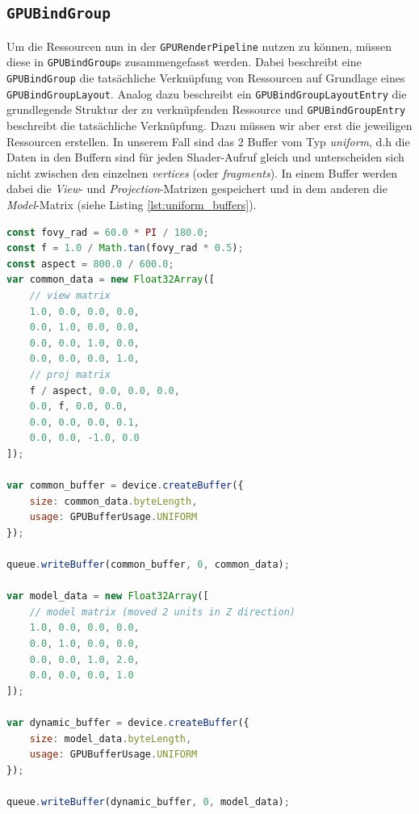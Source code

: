 \documentclass[oneside]{ausarbeitung}
\begin{document}
\subsection{\texttt{GPUBindGroup}}
Um die Ressourcen nun in der \texttt{GPURenderPipeline} nutzen zu können, müssen diese in \texttt{GPUBindGroup}s zusammengefasst werden. Dabei beschreibt eine \texttt{GPUBindGroup} die tatsächliche Verknüpfung von Ressourcen auf Grundlage eines \texttt{GPUBindGroupLayout}. Analog dazu beschreibt ein \texttt{GPUBindGroupLayoutEntry} die grundlegende Struktur der zu verknüpfenden Ressource und \texttt{GPUBindGroupEntry} beschreibt die tatsächliche Verknüpfung. Dazu müssen wir aber erst die jeweiligen Ressourcen erstellen. In unserem Fall sind das 2 Buffer vom Typ \textit{uniform}, d.h die Daten in den Buffern sind für jeden Shader-Aufruf gleich und unterscheiden sich nicht zwischen den einzelnen \textit{vertices} (oder \textit{fragments}). In einem Buffer werden dabei die \textit{View}- und \textit{Projection}-Matrizen gespeichert und in dem anderen die \textit{Model}-Matrix (siehe Listing \ref{lst:uniform_buffers}). 

\begin{minipage}{\textwidth}
\begin{lstlisting}[language=JavaScript, label={lst:uniform_buffers}, caption={Erstellen der Uniform-Buffer für einerseits \textit{common data} (\textit{View}- / \textit{Projection}-Matrix) und anderseits \textit{dynamic data} (\textit{Model}-Matrix).}]
const fovy_rad = 60.0 * PI / 180.0;
const f = 1.0 / Math.tan(fovy_rad * 0.5);
const aspect = 800.0 / 600.0;
var common_data = new Float32Array([
    // view matrix
    1.0, 0.0, 0.0, 0.0,
    0.0, 1.0, 0.0, 0.0,
    0.0, 0.0, 1.0, 0.0,
    0.0, 0.0, 0.0, 1.0,
    // proj matrix
    f / aspect, 0.0, 0.0, 0.0,
    0.0, f, 0.0, 0.0,
    0.0, 0.0, 0.0, 0.1,
    0.0, 0.0, -1.0, 0.0
]);

var common_buffer = device.createBuffer({
    size: common_data.byteLength,
    usage: GPUBufferUsage.UNIFORM
});

queue.writeBuffer(common_buffer, 0, common_data);

var model_data = new Float32Array([
    // model matrix (moved 2 units in Z direction)
    1.0, 0.0, 0.0, 0.0,
    0.0, 1.0, 0.0, 0.0,
    0.0, 0.0, 1.0, 2.0,
    0.0, 0.0, 0.0, 1.0
]);

var dynamic_buffer = device.createBuffer({
    size: model_data.byteLength,
    usage: GPUBufferUsage.UNIFORM
});

queue.writeBuffer(dynamic_buffer, 0, model_data);
\end{lstlisting}
\end{minipage}
\end{document}
